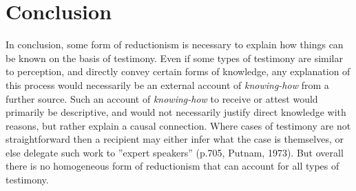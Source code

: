 \documentclass[a4paper, 11pt]{article} %
\begin{document}
\section*{Conclusion}

In conclusion, some form of reductionism is necessary to explain how things can be known on the basis of testimony. Even if some types of testimony are similar to perception, and directly convey certain forms of knowledge, any explanation of this process would necessarily be an external account of \textit{knowing-how} from a further source. Such an account of \textit{knowing-how} to receive or attest would primarily be descriptive, and would not necessarily justify direct knowledge with reasons, but rather explain a causal connection. Where cases of testimony are not straightforward then a recipient may either infer what the case is themselves, or else delegate such work to ''expert speakers'' (p.705, Putnam, 1973)\cite{Putnam:1973}. But overall there is no homogeneous form of reductionism that can account for all types of testimony. 






\doclicenseThis
\end{document}
